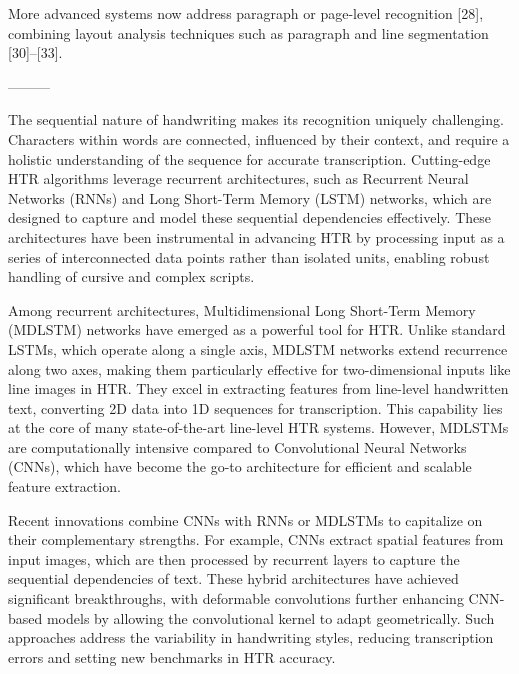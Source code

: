 \documentclass[conference]{IEEEtran}
\begin{document}
More advanced systems now address paragraph or page-level recognition [28], combining layout analysis techniques such as paragraph and line segmentation [30]–[33]. 

---------


The sequential nature of handwriting makes its recognition uniquely challenging. Characters within words are connected, influenced by their context, and require a holistic understanding of the sequence for accurate transcription. Cutting-edge HTR algorithms leverage recurrent architectures, such as Recurrent Neural Networks (RNNs) and Long Short-Term Memory (LSTM) networks, which are designed to capture and model these sequential dependencies effectively. These architectures have been instrumental in advancing HTR by processing input as a series of interconnected data points rather than isolated units, enabling robust handling of cursive and complex scripts.

Among recurrent architectures, Multidimensional Long Short-Term Memory (MDLSTM) networks have emerged as a powerful tool for HTR. Unlike standard LSTMs, which operate along a single axis, MDLSTM networks extend recurrence along two axes, making them particularly effective for two-dimensional inputs like line images in HTR. They excel in extracting features from line-level handwritten text, converting 2D data into 1D sequences for transcription. This capability lies at the core of many state-of-the-art line-level HTR systems. However, MDLSTMs are computationally intensive compared to Convolutional Neural Networks (CNNs), which have become the go-to architecture for efficient and scalable feature extraction.

Recent innovations combine CNNs with RNNs or MDLSTMs to capitalize on their complementary strengths. For example, CNNs extract spatial features from input images, which are then processed by recurrent layers to capture the sequential dependencies of text. These hybrid architectures have achieved significant breakthroughs, with deformable convolutions further enhancing CNN-based models by allowing the convolutional kernel to adapt geometrically. Such approaches address the variability in handwriting styles, reducing transcription errors and setting new benchmarks in HTR accuracy.
\end{document}
